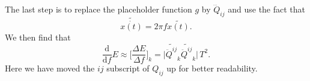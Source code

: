 The last step is to replace the placeholder function $g$ by $\dddot{Q}_{ij}$ and use the fact that
\begin{equation}
\widetilde{\dot{x(t)}} = 2\pi f \widetilde{x(t)}.  
\end{equation}
We then find that 
\begin{equation}
\frac{\mathrm{d}}{\mathrm{d} f} E \approx \Bigg[\frac{\Delta E}{\Delta f}\Bigg]_k = \big|\widetilde{\ddot{Q}^{ij}}_k \widetilde{\ddot{Q}^{ij}}_k| \, T^2.  
\end{equation}
Here we have moved the $ij$ subscript of $Q_{ij}$ up for better readability. 












